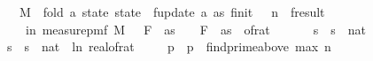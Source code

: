 \begin{isabellebody}
\ \ \ {\isachardoublequoteopen}M\ {\isasymequiv}\ fold\ {\isacharparenleft}{\kern0pt}{\isasymlambda}a\ state{\isachardot}{\kern0pt}\ state\ {\isasymbind}\ f{}{\isacharunderscore}{\kern0pt}update\ a{\isacharparenright}{\kern0pt}\ as\ {\isacharparenleft}{\kern0pt}f{}{\isacharunderscore}{\kern0pt}init\ {\isasymdelta}\ {\isasymepsilon}\ n{\isacharparenright}{\kern0pt}\ {\isasymbind}\ f{}{\isacharunderscore}{\kern0pt}result{\isachardoublequoteclose}\isanewline
\ \ \ {\isachardoublequoteopen}{\isasymP}{\isacharparenleft}{\kern0pt}{\isasymomega}\ in\ measure{\isacharunderscore}{\kern0pt}pmf\ M{\isachardot}{\kern0pt}\ {\isasymbar}{\isasymomega}\ {\isacharminus}{\kern0pt}\ F\ {}\ as{\isasymbar}\ {\isasymle}\ {\isasymdelta}\ {\isacharasterisk}{\kern0pt}\ F\ {}\ as{\isacharparenright}{\kern0pt}\ {\isasymge}\ {}{\isacharminus}{\kern0pt}of{\isacharunderscore}{\kern0pt}rat\ {\isasymepsilon}{\isachardoublequoteclose}\isanewline
%
\isadelimproof
%
\endisadelimproof
%
\isatagproof
{}\isamarkupfalse%
\ {\isacharminus}{\kern0pt}\isanewline
\ \ \isamarkupfalse%
\ s\ \ {\isachardoublequoteopen}s\ {\isacharequal}{\kern0pt}\ nat\ {\isasymlceil}{}\ {\isacharslash}{\kern0pt}\ {\isasymdelta}\isanewline
\ \ \isamarkupfalse%
\ s\ \ {\isachardoublequoteopen}s\ {\isacharequal}{\kern0pt}\ nat\ {\isasymlceil}{\isacharminus}{\kern0pt}{\isacharparenleft}{\kern0pt}{}{}{\isacharasterisk}{\kern0pt}\ ln\ {\isacharparenleft}{\kern0pt}real{\isacharunderscore}{\kern0pt}of{\isacharunderscore}{\kern0pt}rat\ {\isasymepsilon}{\isacharparenright}{\kern0pt}{\isacharparenright}{\kern0pt}{\isasymrceil}{\isachardoublequoteclose}\isanewline
\ \ \isamarkupfalse%
\ p\ \ {\isachardoublequoteopen}p\ {\isacharequal}{\kern0pt}\ find{\isacharunderscore}{\kern0pt}prime{\isacharunderscore}{\kern0pt}above\ {\isacharparenleft}{\kern0pt}max\ n\ {}{\isacharparenright}{\kern0pt}{\isachardoublequoteclose}\isanewline
\ \ \isamarkupfalse%
\ {\isasymOmega}\ \ {\isachardoublequoteopen}{\isasymOmega}\ {\isacharequal}{\kern0pt}\ \isanewline

\end{isabellebody}
